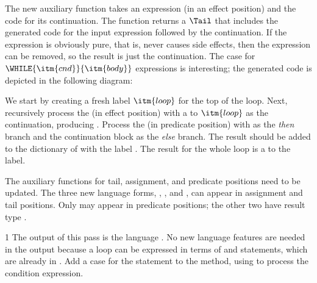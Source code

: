 \documentclass[7x10]{TimesAPriori_MIT}%
\def\pythonEd{1}
\def\edition{1}
\newcommand{\pythonColor}[0]{}
\numberwithin{theorem}{chapter}
\numberwithin{definition}{chapter}
\numberwithin{equation}{chapter}
\begin{document}
{The new auxiliary function  takes an
expression (in an effect position) and the code for its
continuation. The function returns a $\Tail$ that includes the
generated code for the input expression followed by the
continuation. If the expression is obviously pure, that is, never
causes side effects, then the expression can be removed, so the result
is just the continuation.
%
The case for $\WHILE{\itm{cnd}}{\itm{body}}$ expressions is
interesting; the generated code is depicted in the following diagram:
\begin{center}
  \begin{minipage}{0.3\textwidth}
\end{minipage}
\end{center}
We start by creating a fresh label $\itm{loop}$ for the top of the
loop.  Next, recursively process the  (in effect position)
with a  to $\itm{loop}$ as the continuation, producing
. Process the  (in predicate position) with
 as the \emph{then} branch and the continuation block as the
\emph{else} branch. The result should be added to the dictionary of
 with the label . The result for the
whole  loop is a  to the  label.

The auxiliary functions for tail, assignment, and predicate positions
need to be updated. The three new language forms, ,
, and , can appear in assignment and tail
positions.  Only  may appear in predicate positions; the
other two have result type .

\fi}
%
{\if\edition\pythonEd\pythonColor
%
The output of this pass is the language \LangCIf{}. No new language
features are needed in the output because a  loop can be
expressed in terms of  and  statements, which are
already in \LangCIf{}.
%  
Add a case for the  statement to the
 method, using  to process
the condition expression.
%
\fi}
\end{document}

